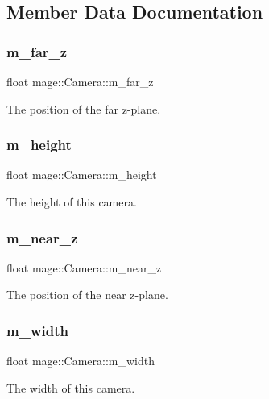 \subsection{Member Data Documentation}
\hypertarget{classmage_1_1_camera_abe2eeca725ce3da238256007454b241f}{}\label{classmage_1_1_camera_abe2eeca725ce3da238256007454b241f} 
\subsubsection{\texorpdfstring{m\+\_\+far\+\_\+z}{m\_far\_z}}
{\footnotesize\ttfamily float mage\+::\+Camera\+::m\+\_\+far\+\_\+z\hspace{0.3cm}{\ttfamily [private]}}

The position of the far z-\/plane. \hypertarget{classmage_1_1_camera_a48485eca596702f0e5985ec8b7db35a5}{}\label{classmage_1_1_camera_a48485eca596702f0e5985ec8b7db35a5} 
\subsubsection{\texorpdfstring{m\+\_\+height}{m\_height}}
{\footnotesize\ttfamily float mage\+::\+Camera\+::m\+\_\+height\hspace{0.3cm}{\ttfamily [private]}}

The height of this camera. \hypertarget{classmage_1_1_camera_a685f8700a29d1f1eff2bec353c3ec970}{}\label{classmage_1_1_camera_a685f8700a29d1f1eff2bec353c3ec970} 
\subsubsection{\texorpdfstring{m\+\_\+near\+\_\+z}{m\_near\_z}}
{\footnotesize\ttfamily float mage\+::\+Camera\+::m\+\_\+near\+\_\+z\hspace{0.3cm}{\ttfamily [private]}}

The position of the near z-\/plane. \hypertarget{classmage_1_1_camera_acc8f371214af02fdac9a1ff04508c4ca}{}\label{classmage_1_1_camera_acc8f371214af02fdac9a1ff04508c4ca} 
\subsubsection{\texorpdfstring{m\+\_\+width}{m\_width}}
{\footnotesize\ttfamily float mage\+::\+Camera\+::m\+\_\+width\hspace{0.3cm}{\ttfamily [private]}}

The width of this camera. 